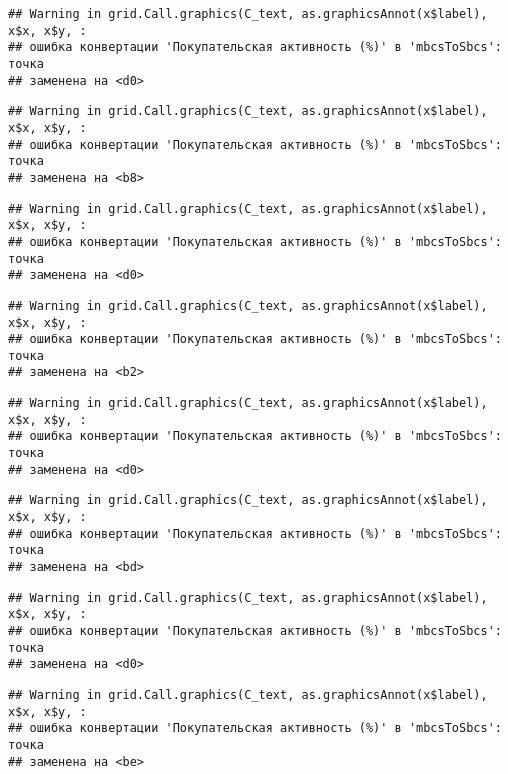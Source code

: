 \documentclass[
]{article}
\begin{document}
\begin{verbatim}
## Warning in grid.Call.graphics(C_text, as.graphicsAnnot(x$label), x$x, x$y, :
## ошибка конвертации 'Покупательская активность (%)' в 'mbcsToSbcs': точка
## заменена на <d0>
\end{verbatim}

\begin{verbatim}
## Warning in grid.Call.graphics(C_text, as.graphicsAnnot(x$label), x$x, x$y, :
## ошибка конвертации 'Покупательская активность (%)' в 'mbcsToSbcs': точка
## заменена на <b8>
\end{verbatim}

\begin{verbatim}
## Warning in grid.Call.graphics(C_text, as.graphicsAnnot(x$label), x$x, x$y, :
## ошибка конвертации 'Покупательская активность (%)' в 'mbcsToSbcs': точка
## заменена на <d0>
\end{verbatim}

\begin{verbatim}
## Warning in grid.Call.graphics(C_text, as.graphicsAnnot(x$label), x$x, x$y, :
## ошибка конвертации 'Покупательская активность (%)' в 'mbcsToSbcs': точка
## заменена на <b2>
\end{verbatim}

\begin{verbatim}
## Warning in grid.Call.graphics(C_text, as.graphicsAnnot(x$label), x$x, x$y, :
## ошибка конвертации 'Покупательская активность (%)' в 'mbcsToSbcs': точка
## заменена на <d0>
\end{verbatim}

\begin{verbatim}
## Warning in grid.Call.graphics(C_text, as.graphicsAnnot(x$label), x$x, x$y, :
## ошибка конвертации 'Покупательская активность (%)' в 'mbcsToSbcs': точка
## заменена на <bd>
\end{verbatim}

\begin{verbatim}
## Warning in grid.Call.graphics(C_text, as.graphicsAnnot(x$label), x$x, x$y, :
## ошибка конвертации 'Покупательская активность (%)' в 'mbcsToSbcs': точка
## заменена на <d0>
\end{verbatim}

\begin{verbatim}
## Warning in grid.Call.graphics(C_text, as.graphicsAnnot(x$label), x$x, x$y, :
## ошибка конвертации 'Покупательская активность (%)' в 'mbcsToSbcs': точка
## заменена на <be>
\end{verbatim}
\end{document}

